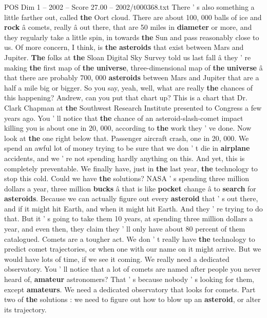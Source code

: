 \begin{textsample}{POS Dim 1 – 2002 – Score 27.00 – 2002/t000368.txt}
There ' s also something a little farther out, called \textbf{the} Oort cloud.
There are about 100, 000 balls of ice and \textbf{rock} â comets, really â out there, that are 50 miles in \textbf{diameter} or more, and they regularly take a little spin, in towards \textbf{the} Sun and pass reasonably close to us.
Of more concern, I think, is \textbf{the} \textbf{asteroids} that exist between Mars and Jupiter. \textbf{The} folks at \textbf{the} Sloan Digital Sky Survey told us last fall â they ' re making \textbf{the} first map of \textbf{the} \textbf{universe}, three-dimensional map of \textbf{the} \textbf{universe} â that there are probably 700, 000 \textbf{asteroids} between Mars and Jupiter that are a half a mile big or bigger.
So you say, yeah, well, what are really \textbf{the} chances of this happening?
Andrew, can you put that chart up?
This is a chart that Dr.
Clark Chapman at \textbf{the} Southwest Research Institute presented to Congress a few years ago.
You ' ll notice that \textbf{the} chance of an asteroid-slash-comet impact killing you is about one in 20, 000, according to \textbf{the} work they ' ve done.
Now look at \textbf{the} one right below that.
Passenger aircraft crash, one in 20, 000.
We spend an awful lot of money trying to be sure that we don ' t die in \textbf{airplane} accidents, and we ' re not spending hardly anything on this.
And yet, this is completely preventable.
We finally have, just in \textbf{the} last year, \textbf{the} technology to stop this cold.
Could we have \textbf{the} solutions?
NASA ' s spending three million dollars a year, three million \textbf{bucks} â that is like \textbf{pocket} change â to \textbf{search} for \textbf{asteroids}.
Because we can actually figure out every \textbf{asteroid} that ' s out there, and if it might hit Earth, and when it might hit Earth.
And they ' re trying to do that.
But it ' s going to take them 10 years, at spending three million dollars a year, and even then, they claim they ' ll only have about 80 percent of them catalogued.
Comets are a tougher act.
We don ' t really have \textbf{the} technology to predict comet trajectories, or when one with our name on it might arrive.
But we would have lots of time, if we see it coming.
We really need a dedicated observatory.
You ' ll notice that a lot of comets are named after people you never heard of, \textbf{amateur} astronomers?
That ' s because nobody ' s looking for them, except \textbf{amateurs}.
We need a dedicated observatory that looks for comets.
Part two of \textbf{the} solutions : we need to figure out how to blow up an \textbf{asteroid}, or alter its trajectory.

\end{textsample}
